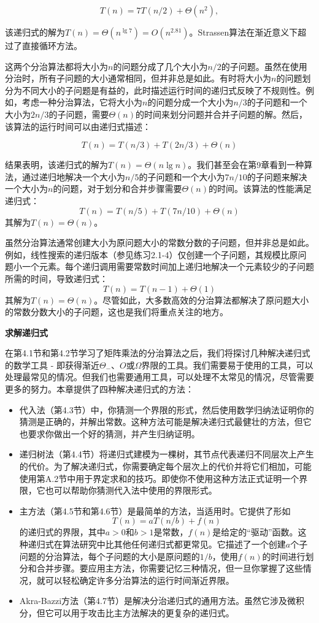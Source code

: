 \documentclass[lang=cn,newtx,10pt,scheme=chinese]{elegantbook}
\begin{document}
$$
T(n)=7 T(n / 2)+\Theta\left(n^2\right),
$$

该递归式的解为$T(n)=\Theta\left(n^{\lg 7}\right)=O\left(n^{2.81}\right)$。Strassen算法在渐近意义下超过了直接循环方法。

这两个分治算法都将大小为$n$的问题分成了几个大小为$n/2$的子问题。虽然在使用分治时，所有子问题的大小通常相同，但并非总是如此。有时将大小为$n$的问题划分为不同大小的子问题是有益的，此时描述运行时间的递归式反映了不规则性。例如，考虑一种分治算法，它将大小为$n$的问题分成一个大小为$n/3$的子问题和一个大小为$2n/3$的子问题，需要$\Theta(n)$的时间来划分问题并合并子问题的解。然后，该算法的运行时间可以由递归式描述：

$$
T(n)=T(n / 3)+T(2 n / 3)+\Theta(n)
$$

结果表明，该递归式的解为$T(n)=\Theta(n \lg n)$。我们甚至会在第9章看到一种算法，通过递归地解决一个大小为$n/5$的子问题和一个大小为$7n/10$的子问题来解决一个大小为$n$的问题，对于划分和合并步骤需要$\Theta(n)$的时间。该算法的性能满足递归式：
$$
T(n)=T(n / 5)+T(7 n / 10)+\Theta(n)
$$
其解为$T(n)=\Theta(n)$。

虽然分治算法通常创建大小为原问题大小的常数分数的子问题，但并非总是如此。例如，线性搜索的递归版本（参见练习2.1-4）仅创建一个子问题，其规模比原问题小一个元素。每个递归调用需要常数时间加上递归地解决一个元素较少的子问题所需的时间，导致递归式：
$$
T(n)=T(n-1)+\Theta(1)
$$
其解为$T(n)=\Theta(n)$。尽管如此，大多数高效的分治算法都解决了原问题大小的常数分数大小的子问题，这也是我们将重点关注的地方。

\textbf{求解递归式}

在第4.1节和第4.2节学习了矩阵乘法的分治算法之后，我们将探讨几种解决递归式的数学工具 - 即获得渐近$\Theta_{-}$、$O$或$\Omega$界限的工具。我们需要易于使用的工具，可以处理最常见的情况。但我们也需要通用工具，可以处理不太常见的情况，尽管需要更多的努力。本章提供了四种解决递归式的方法：

\begin{itemize}
\item 代入法（第4.3节）中，你猜测一个界限的形式，然后使用数学归纳法证明你的猜测是正确的，并解出常数。这种方法可能是解决递归式最健壮的方法，但它也要求你做出一个好的猜测，并产生归纳证明。
\item 递归树法（第4.4节）将递归式建模为一棵树，其节点代表递归不同层次上产生的代价。为了解决递归式，你需要确定每个层次上的代价并将它们相加，可能使用第A.2节中用于界定求和的技巧。即使你不使用这种方法正式证明一个界限，它也可以帮助你猜测代入法中使用的界限形式。
\item 主方法（第4.5节和第4.6节）是最简单的方法，当适用时。它提供了形如
$$
T(n)=a T(n / b)+f(n)
$$
的递归式的界限，其中$a>0$和$b>1$是常数，$f(n)$是给定的“驱动”函数。这种递归式在算法研究中比其他任何递归式都更常见。它描述了一个创建$a$个子问题的分治算法，每个子问题的大小是原问题的$1/b$，使用$f(n)$的时间进行划分和合并步骤。要应用主方法，你需要记忆三种情况，但一旦你掌握了这些情况，就可以轻松确定许多分治算法的运行时间渐近界限。
\item Akra-Bazzi方法（第4.7节）是解决分治递归式的通用方法。虽然它涉及微积分，但它可以用于攻击比主方法解决的更复杂的递归式。
\end{itemize}
\end{document}
